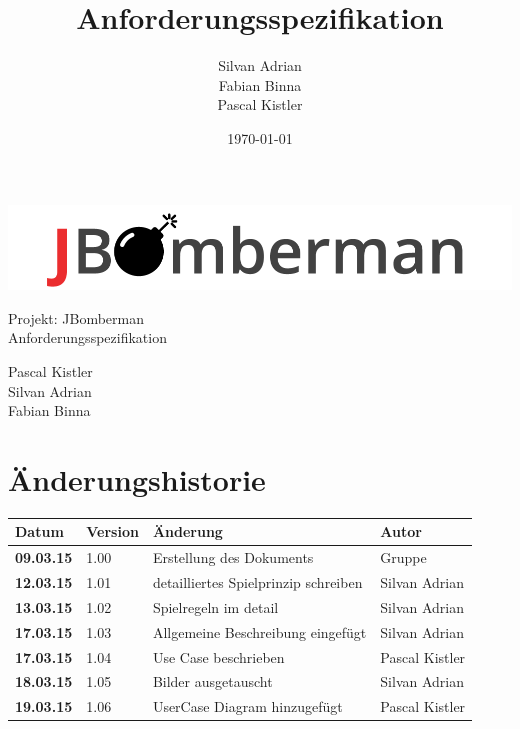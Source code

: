 \documentclass[11pt]{scrartcl}
\title{Anforderungsspezifikation}
\author{Silvan Adrian \\ Fabian Binna \\ Pascal Kistler}
\date{\today{}}
\begin{document}
\def\arraystretch{1.5}
\begin{titlepage}
\begin{center}
\vspace{10em}
\includegraphics[scale=2]{jbomberman}
\vspace{10em}
\end{center}
\begin{center}
\huge {Projekt: JBomberman} \\
\huge {Anforderungsspezifikation}
\end{center}
\begin{center}
\vspace{10em}
\LARGE {Pascal Kistler} \\
\LARGE {Silvan Adrian} \\
\LARGE {Fabian Binna}
\end{center}

\end{titlepage}

\newpage
\section{Änderungshistorie}
\label{sec:Änderungen}

\begin{tabularx}{\linewidth}{l l l l}
\textbf{Datum} & \textbf{Version} & \textbf{Änderung}  & \textbf{Autor} \\
\hline
\textbf{09.03.15} & 1.00 & Erstellung des Dokuments & Gruppe \\
\textbf{12.03.15} & 1.01 & detailliertes Spielprinzip schreiben & Silvan Adrian \\
\textbf{13.03.15} & 1.02 & Spielregeln im detail & Silvan Adrian \\
\textbf{17.03.15} & 1.03 & Allgemeine Beschreibung eingefügt & Silvan Adrian \\
\textbf{17.03.15} & 1.04 & Use Case beschrieben  & Pascal Kistler \\
\textbf{18.03.15} & 1.05 & Bilder ausgetauscht & Silvan Adrian \\
\textbf{19.03.15} & 1.06 & UserCase Diagram hinzugefügt & Pascal Kistler \\
\end{tabularx}
\end{document}

